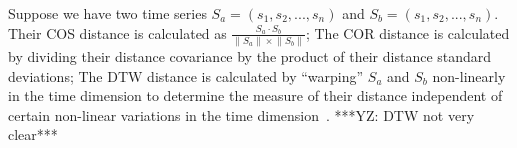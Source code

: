 Suppose we have two time series $S_a = (s_1,s_2, ... ,s_n)$ and $S_b = (s_1, s_2, ..., s_n)$.  Their COS distance is calculated as $\frac{S_{a}\cdot S_{b}}{\left \| S_{a}\right \|\times \left \| S_{b} \right \|}$;   The COR distance is calculated by dividing their distance covariance by the product of their distance standard deviations; The DTW distance is calculated by ``warping'' $S_a$ and $S_b$ non-linearly in the time dimension to determine the measure of their distance independent of certain non-linear variations in the time dimension~\cite{dtw}. ***YZ: DTW not very clear***


